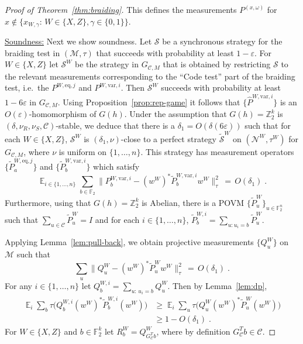 \documentclass[11pt]{article}
\theoremstyle{definition}
\newcommand{\code}{\mathscr{C}}
\newcommand{\strategy}{\mathscr{S}}
\newcommand{\Id}{\ensuremath{I}}
\DeclareMathOperator*{\Expectation}{\mathbb{E}}
\newcommand{\Es}[1]{\Expectation_{#1}}
\newcommand{\field}{\mathbb{F}_2}
\newcommand{\F}{\ensuremath{\mathbb{F}}}
\newcommand{\Z}{\ensuremath{\mathbb{Z}}}
\newcommand{\mC}{\ensuremath{\mathcal{C}}}
\newcommand{\mM}{\ensuremath{\mathcal{M}}}
\newcommand{\eps}{\varepsilon}
\newcommand{\mN}{\mathcal{N}}
\newcommand{\eq}{\mathrm{eq}}
\newcommand{\var}{\mathrm{var}}
\begin{document}
\begin{proof}[Proof of Theorem~\ref{thm:braiding}]
This defines the measurements $P^{(x,\omega)}$ for $x\notin \{x_{W,\gamma}:\,W\in\{X,Z\},\gamma\in\{0,1\}\}$. 

\bigskip 

\underline{Soundness:} Next we show soundness. Let $\strategy$ be a synchronous strategy for the braiding test  in  $(\mM,\tau)$ that succeeds with probability at least $1-\eps$. For $W\in\{X,Z\}$ let $\strategy^W$ be the strategy in $G_{\code,M}$ that is obtained by restricting $\strategy$ to the relevant measurements corresponding to the ``Code test'' part of the braiding test, i.e.\ the $P^{W,\eq,j}$ and $P^{W,\var,i}$.  Then $\strategy^W$ succeeds with probability at least $1-6\eps$ in $G_{\code,M}$. Using Proposition~\ref{prop:rep-game} it follows that $\{\widehat{P}^{W,\var,i}\}$ is an $O(\eps)$-homomorphism of $G(h)$. Under the assumption that $G(h)=\Z_2^k$ is $(\delta,\nu_R,\nu_S,\mC)$-stable, we deduce that there is a $\delta_1 = O({\delta(6\eps)})$ such that for each $W\in\{X,Z\}$, $\strategy^W$ is $(\delta_1,\nu)$-close to a perfect strategy $\tilde{\strategy}^W$ on $(\mN^W,\tau^W)$ for $G_{\code,M}$, where $\nu$ is uniform on $\{1,\ldots,n\}$. This strategy has measurement operators $\{ \tilde{P}^{W,\eq,j}_a\}$ and $\{\tilde{P}^{W,\var,i}_b\}$ which satisfy 
\begin{equation}\label{eq:main-0}
\Es{i\in\{1,\ldots,n\}}\sum_{b \in \F_2} \big\|P^{W,\var,i}_b - (w^W)^* \tilde{P}_b^{W,\var,i} w^W \big\|^2_\tau \,=\, O(\delta_1)\;.
\end{equation}
Furthermore, using that $G(h)=\Z_2^k$ is Abelian, there is a  POVM $\{\tilde{P}^W_u\}_{u\in \field^n}$ such that $\sum_{u\in \code}\tilde{P}^W_u = \Id$ and for each $i\in \{1,\ldots,n\}$, $\tilde{P}^{W,i}_b = \sum_{u:u_i=b} \tilde{P}^W_u$.
 
Applying Lemma~\ref{lem:pull-back}, we obtain projective measurements $\{Q^W_u\}$ on $\mM$ such that 
\begin{equation}\label{eq:main-1}
\sum_u \big\|Q^W_u - (w^W)^* \tilde{P}_u^W w^W \big\|^2_\tau \,=\, O(\delta_1)\;.
\end{equation}
For any $i\in\{1,\ldots,n\}$ let $Q^{W,i}_b = \sum_{u:\,u_i=b}  Q^W_u$. Then by Lemma~\ref{lem:dp},
\begin{align*}
\Es{i}\sum_b \tau\big( Q^{W,i}_b (w^W)^*\tilde{P}^{W,i}_b(w^W) \big)
&\geq \Es{i}\sum_u \tau\big( Q^{W}_u (w^W)^*\tilde{P}^{W}_u(w^W) \big)\\
&\geq 1-O(\delta_1)\;.
\end{align*}
For $W\in\{X,Z\}$ and $b\in \F_2^k$ let $R^W_b = Q^W_{G_\mC^T b}$, where by definition $G_\mC^T b\in \mC$. 


\end{proof}
\end{document}
